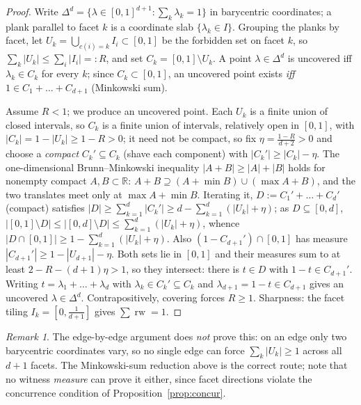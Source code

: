 \documentclass[11pt,reqno]{amsart}
\theoremstyle{plain}
\theoremstyle{definition}
\theoremstyle{remark}
\newtheorem{remark}[theorem]{Remark}
\newcommand{\rw}{\operatorname{rw}}
\newcommand{\R}{\mathbb{R}}
\begin{document}
\begin{proof}
Write $\Delta^d=\{\lambda\in[0,1]^{d+1}:\sum_k\lambda_k=1\}$ in barycentric
coordinates; a plank parallel to facet $k$ is a coordinate slab
$\{\lambda_k\in I\}$. Grouping the planks by facet, let
$U_k=\bigcup_{c(i)=k}I_i\subset[0,1]$ be the forbidden set on facet $k$, so
$\sum_k|U_k|\le\sum_i|I_i|=:R$, and set $C_k=[0,1]\setminus U_k$. A point
$\lambda\in\Delta^d$ is uncovered iff $\lambda_k\in C_k$ for every $k$; since
$C_k\subset[0,1]$, an uncovered point exists \emph{iff}
$1\in C_1+\dots+C_{d+1}$ (Minkowski sum).

Assume $R<1$; we produce an uncovered point. Each $U_k$ is a finite union of
closed intervals, so $C_k$ is a finite union of intervals, relatively open in
$[0,1]$, with $|C_k|=1-|U_k|\ge1-R>0$; it need not be compact, so fix
$\eta=\tfrac{1-R}{d+2}>0$ and choose a \emph{compact} $C_k'\subseteq C_k$ (shave
each component) with $|C_k'|\ge|C_k|-\eta$. The one-dimensional
Brunn--Minkowski inequality $|A+B|\ge|A|+|B|$ holds for nonempty compact
$A,B\subset\R$: $A+B\supseteq(A+\min B)\cup(\max A+B)$, and the two translates
meet only at $\max A+\min B$. Iterating it, $D:=C_1'+\dots+C_d'$ (compact)
satisfies $|D|\ge\sum_{k=1}^d|C_k'|\ge d-\sum_{k=1}^d(|U_k|+\eta)$; as
$D\subseteq[0,d]$,
$|[0,1]\setminus D|\le|[0,d]\setminus D|\le\sum_{k=1}^d(|U_k|+\eta)$, whence
$|D\cap[0,1]|\ge1-\sum_{k=1}^d(|U_k|+\eta)$. Also $(1-C_{d+1}')\cap[0,1]$ has
measure $|C_{d+1}'|\ge1-|U_{d+1}|-\eta$. Both sets lie in $[0,1]$ and their
measures sum to at least $2-R-(d+1)\eta>1$, so they intersect: there is $t\in D$
with $1-t\in C_{d+1}'$. Writing $t=\lambda_1+\dots+\lambda_d$ with
$\lambda_k\in C_k'\subseteq C_k$ and $\lambda_{d+1}=1-t\in C_{d+1}$ gives an
uncovered $\lambda\in\Delta^d$.
Contrapositively, covering forces $R\ge1$. Sharpness: the facet tiling
$I_k=[0,\tfrac1{d+1}]$ gives $\sum\rw=1$.
\end{proof}
\begin{remark}
The edge-by-edge argument does \emph{not} prove this: on an edge only two
barycentric coordinates vary, so no single edge can force $\sum_k|U_k|\ge1$ across
all $d+1$ facets. The Minkowski-sum reduction above is the correct route; note that
no witness \emph{measure} can prove it either, since facet directions violate the
concurrence condition of Proposition~\ref{prop:concur}.
\end{remark}
\end{document}
